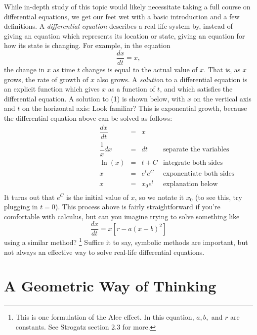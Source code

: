 \documentclass[man, 12pt]{apa6}
\begin{document}

While in-depth study of this topic would likely necessitate taking a full course on differential equations, we get our feet wet with a basic introduction and a few definitions. A \emph{differential equation} describes a real life system by, instead of giving an equation which represents its location or state, giving an equation for how its state is changing. For example, in the equation 
\begin{equation}
\frac{dx}{dt}=x,
\end{equation}
the change in $x$ as time $t$ changes is equal to the actual value of $x$. That is, as $x$ grows, the rate of growth of $x$ also grows. A \emph{solution} to a differential equation is an explicit function which gives $x$ as a function of $t$, and which satisfies the differential equation. A solution to (1) is shown below, with $x$ on the vertical axis and $t$ on the horizontal axis:
Look familiar? This is exponential growth, because the differential equation above can be solved as follows:
\[\begin{array}{rrcll}
&\dfrac{dx}{dt}&=&x\\
&\dfrac{1}{x}dx &=& dt & \text{separate the variables}\\
&\ln(x)&=&t+C& \text{integrate both sides}\\
\phantom{\text{exponentiate both sides}}&x&=&e^t e^C& \text{exponentiate both sides}\\
&x&=&x_0 e^t& \text{explanation below}\\
\end{array}\]
It turns out that $e^C$ is the initial value of $x$, so we notate it $x_0$ (to see this, try plugging in $t=0$). This process above is fairly straightforward if you're comfortable with calculus, but can you imagine trying to solve something like 
$$\dfrac{dx}{dt}=x\left[r-a(x-b)^2\right]$$
using a similar method? \footnote{This is one formulation of the Alee effect. In this equation, $a,b,$ and $r$ are constants. See Strogatz section 2.3 for more.} Suffice it to say, symbolic methods are important, but not always an effective way to solve real-life differential equations. 

\section{A Geometric Way of Thinking}
\end{document}
